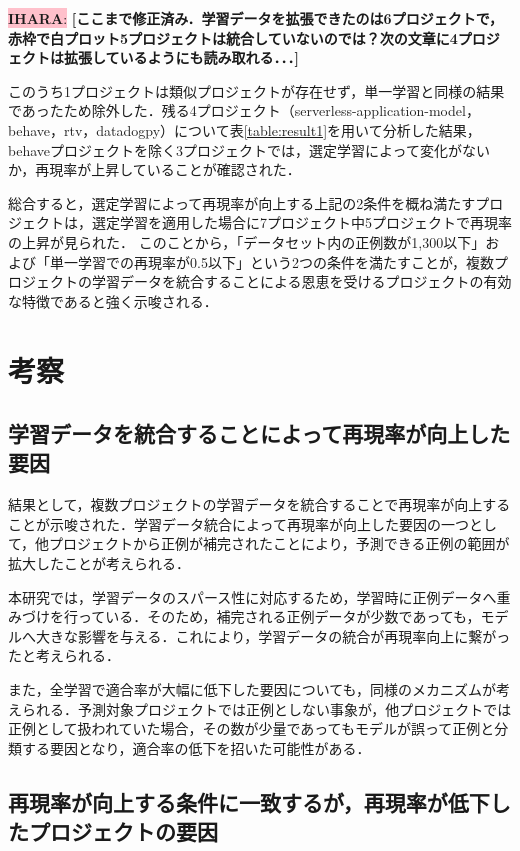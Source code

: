 \documentclass[submit]{ipsj}
\newcommand{\ihara}[1]{\colorbox{pink}{{\bf IHARA}:}{\color{blue} {\textbf{[#1]}}}}
\begin{document}
\ihara{ここまで修正済み．学習データを拡張できたのは6プロジェクトで，赤枠で白プロット5プロジェクトは統合していないのでは？次の文章に4プロジェクトは拡張しているようにも読み取れる．．．}

このうち1プロジェクトは類似プロジェクトが存在せず，単一学習と同様の結果であったため除外した．残る4プロジェクト（serverless-application-model，behave，rtv，datadogpy）について表\ref{table:result1}を用いて分析した結果，behaveプロジェクトを除く3プロジェクトでは，選定学習によって変化がないか，再現率が上昇していることが確認された．

総合すると，選定学習によって再現率が向上する上記の2条件を概ね満たすプロジェクトは，選定学習を適用した場合に7プロジェクト中5プロジェクトで再現率の上昇が見られた．
このことから，「データセット内の正例数が1,300以下」および「単一学習での再現率が0.5以下」という2つの条件を満たすことが，複数プロジェクトの学習データを統合することによる恩恵を受けるプロジェクトの有効な特徴であると強く示唆される．


\section{考察}\label{chap:consideration}

\subsection{学習データを統合することによって再現率が向上した要因}

結果として，複数プロジェクトの学習データを統合することで再現率が向上することが示唆された．学習データ統合によって再現率が向上した要因の一つとして，他プロジェクトから正例が補完されたことにより，予測できる正例の範囲が拡大したことが考えられる．

本研究では，学習データのスパース性に対応するため，学習時に正例データへ重みづけを行っている．そのため，補完される正例データが少数であっても，モデルへ大きな影響を与える．これにより，学習データの統合が再現率向上に繋がったと考えられる．

また，全学習で適合率が大幅に低下した要因についても，同様のメカニズムが考えられる．予測対象プロジェクトでは正例としない事象が，他プロジェクトでは正例として扱われていた場合，その数が少量であってもモデルが誤って正例と分類する要因となり，適合率の低下を招いた可能性がある．


\subsection{再現率が向上する条件に一致するが，再現率が低下したプロジェクトの要因}
\end{document}
